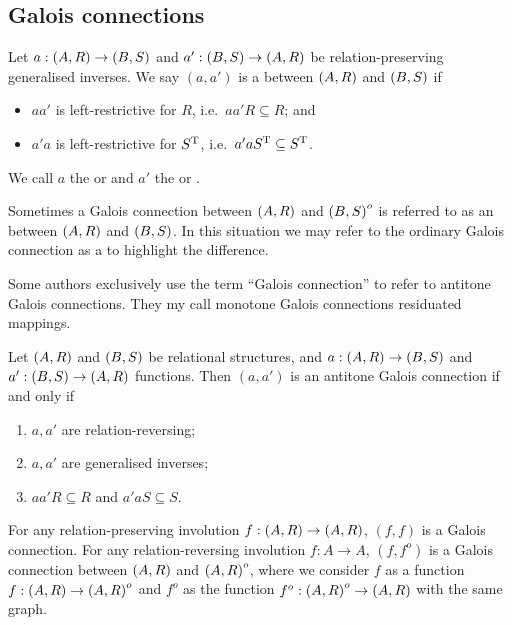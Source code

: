 \subsection{Galois connections}
\begin{definition}
Let $a: \left( A,R \right) \to \left( B,S \right)$ and $a': \left( B,S \right) \to \left( A,R \right)$ be relation-preserving generalised inverses. We say $(a,a')$ is a  between $\left( A, R \right)$ and $\left( B, S \right)$ if
\begin{itemize}
\item $aa'$ is left-restrictive for $R$, i.e.\ $aa'R \subseteq R$; and
\item $a'a$ is left-restrictive for $S^{\mathrm{T}}$, i.e.\ $a'aS^{\mathrm{T}} \subseteq S^{\mathrm{T}}$.
\end{itemize}
We call $a$ the  or  and $a'$ the  or .

Sometimes a Galois connection between $\left( A, R \right)$ and $\left( B, S \right)^o$ is referred to as an  between $\left( A, R \right)$ and $\left( B, S \right)$. In this situation we may refer to the ordinary Galois connection as a  to highlight the difference.
\end{definition}
Some authors exclusively use the term ``Galois connection'' to refer to antitone Galois connections. They my call monotone Galois connections residuated mappings.

\begin{lemma}
Let $\left( A, R \right)$ and $\left( B, S \right)$ be relational structures, and $a: \left( A,R \right) \to \left( B,S \right)$ and $a': \left( B,S \right) \to \left( A,R \right)$ functions. Then $(a,a')$ is an antitone Galois connection \textup{if and only if}
\begin{enumerate}
\item $a, a'$ are relation-reversing;
\item $a, a'$ are generalised inverses;
\item $aa'R \subseteq R$ and $a'aS \subseteq S$.
\end{enumerate}
\end{lemma}

For any relation-preserving involution $f: \left( A,R \right) \to \left( A,R \right)$,  $(f,f)$ is a Galois connection. For any relation-reversing involution $f: A\to A$, $(f,f^o)$ is a Galois connection between $\left( A,R \right)$ and $\left( A,R \right)^o$, where we consider $f$ as a function $f: \left( A,R \right) \to \left( A,R \right)^o$ and $f^o$ as the function $f^o: \left( A,R \right)^o \to \left( A,R \right)$ with the same graph.

